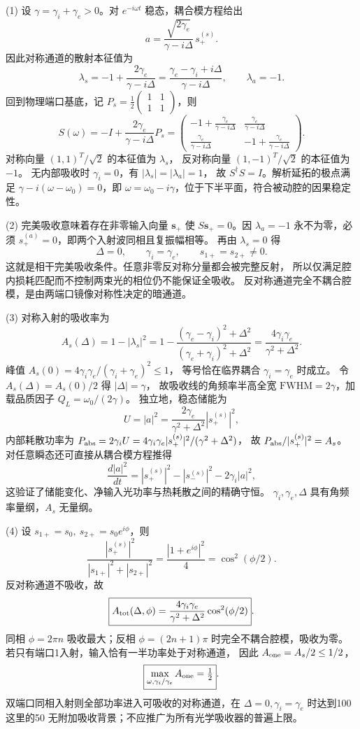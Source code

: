 (1) 设 \(\gamma=\gamma_i+\gamma_e>0\)。对 \(e^{-i\omega t}\) 稳态，耦合模方程给出
\[
 a=\frac{\sqrt{2\gamma_e}}{\gamma-i\Delta}\,s_+^{(s)}.
\]
因此对称通道的散射本征值为
\[
 \lambda_s=-1+\frac{2\gamma_e}{\gamma-i\Delta}
 =\frac{\gamma_e-\gamma_i+i\Delta}{\gamma-i\Delta},
 \qquad \lambda_a=-1.
\]
回到物理端口基底，记
\(P_s=\frac12\begin{pmatrix}1&1\\1&1\end{pmatrix}\)，则
\[
 \boxed{S(\omega)=-I+\frac{2\gamma_e}{\gamma-i\Delta}P_s
 =\begin{pmatrix}
 -1+\frac{\gamma_e}{\gamma-i\Delta}&\frac{\gamma_e}{\gamma-i\Delta}\\
 \frac{\gamma_e}{\gamma-i\Delta}&-1+\frac{\gamma_e}{\gamma-i\Delta}
 \end{pmatrix}}.
\]
对称向量 \((1,1)^T/\sqrt2\) 的本征值为 \(\lambda_s\)，
反对称向量 \((1,-1)^T/\sqrt2\) 的本征值为 \(-1\)。
无内部吸收时 \(\gamma_i=0\)，有 \(|\lambda_s|=|\lambda_a|=1\)，
故 \(S^\dagger S=I\)。解析延拓的极点满足
\(\gamma-i(\omega-\omega_0)=0\)，即
\(\omega=\omega_0-i\gamma\)，位于下半平面，符合被动腔的因果稳定性。

(2) 完美吸收意味着存在非零输入向量 \(\mathbf s_+\) 使
\(S\mathbf s_+=0\)。因 \(\lambda_a=-1\) 永不为零，必须
\(s_+^{(a)}=0\)，即两个入射波同相且复振幅相等。
再由 \(\lambda_s=0\) 得
\[
 \boxed{\Delta=0,\qquad\gamma_i=\gamma_e,\qquad
 s_{1+}=s_{2+}\ne0}.
\]
这就是相干完美吸收条件。任意非零反对称分量都会被完整反射，
所以仅满足腔内损耗匹配而不控制两束光的相位仍不能保证全吸收。
反对称通道完全不耦合腔模，是由两端口镜像对称性决定的暗通道。

(3) 对称入射的吸收率为
\[
 A_s(\Delta)=1-|\lambda_s|^2
 =1-\frac{(\gamma_e-\gamma_i)^2+\Delta^2}
 {(\gamma_e+\gamma_i)^2+\Delta^2}
 =\boxed{\frac{4\gamma_i\gamma_e}{\gamma^2+\Delta^2}}.
\]
峰值 \(A_s(0)=4\gamma_i\gamma_e/(\gamma_i+\gamma_e)^2\le1\)，
等号恰在临界耦合 \(\gamma_i=\gamma_e\) 时成立。
令 \(A_s(\Delta)=A_s(0)/2\) 得 \(|\Delta|=\gamma\)，
故吸收线的角频率半高全宽
\(\boxed{\mathrm{FWHM}=2\gamma}\)，加载品质因子
\(\boxed{Q_L=\omega_0/(2\gamma)}\)。
独立地，稳态储能为
\[
 U=|a|^2=\frac{2\gamma_e}{\gamma^2+\Delta^2}|s_+^{(s)}|^2,
\]
内部耗散功率为
\(P_{\rm abs}=2\gamma_iU
 =4\gamma_i\gamma_e|s_+^{(s)}|^2/(\gamma^2+\Delta^2)\)，
故 \(P_{\rm abs}/|s_+^{(s)}|^2=A_s\)。
对任意瞬态还可直接从耦合模方程推得
\[
 \frac{d|a|^2}{dt}
 =|s_+^{(s)}|^2-|s_-^{(s)}|^2-2\gamma_i|a|^2,
\]
这验证了储能变化、净输入光功率与热耗散之间的精确守恒。
\(\gamma_i,\gamma_e,\Delta\) 具有角频率量纲，\(A_s\) 无量纲。

(4) 设 \(s_{1+}=s_0,\ s_{2+}=s_0e^{i\phi}\)，则
\[
 \frac{|s_+^{(s)}|^2}{|s_{1+}|^2+|s_{2+}|^2}
 =\frac{|1+e^{i\phi}|^2}{4}=\cos^2(\phi/2).
\]
反对称通道不吸收，故
\[
 \boxed{A_{\rm tot}(\Delta,\phi)
 =\frac{4\gamma_i\gamma_e}{\gamma^2+\Delta^2}\cos^2(\phi/2)}.
\]
同相 \(\phi=2\pi n\) 吸收最大；反相
\(\phi=(2n+1)\pi\) 时完全不耦合腔模，吸收为零。
若只有端口1入射，输入恰有一半功率处于对称通道，
因此 \(A_{\rm one}=A_s/2\le1/2\)，
\[
 \boxed{\max_{\omega,\gamma_i/\gamma_e}A_{\rm one}=\tfrac12}.
\]
双端口同相入射则全部功率进入可吸收的对称通道，在
\(\Delta=0,\gamma_i=\gamma_e\) 时达到100%
这里的50%
无附加吸收背景；不应推广为所有光学吸收器的普遍上限。
